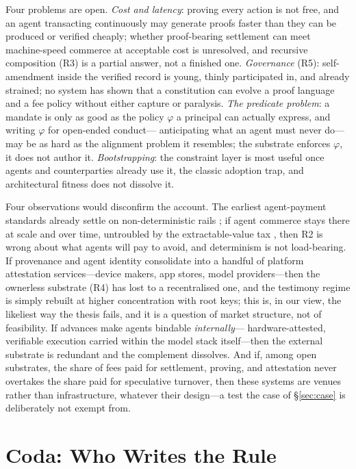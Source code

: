 \documentclass[11pt]{article}
\newcommand{\R}[1]{R#1}
\begin{document}
Four problems are open. \emph{Cost and latency}: proving every action is
not free, and an agent transacting continuously may generate proofs
faster than they can be produced or verified cheaply; whether
proof-bearing settlement can meet machine-speed commerce at acceptable
cost is unresolved, and recursive composition (\R{3}) is a partial answer,
not a finished one. \emph{Governance} (\R{5}): self-amendment inside the
verified record is young, thinly participated in, and already strained;
no system has shown that a constitution can evolve a proof language and
a fee policy without either capture or paralysis. \emph{The predicate
problem}: a mandate is only as good as the policy $\varphi$ a principal
can actually express, and writing $\varphi$ for open-ended conduct---
anticipating what an agent must never do---may be as hard as the
alignment problem it resembles; the substrate enforces $\varphi$, it does
not author it. \emph{Bootstrapping}: the constraint layer is most useful
once agents and counterparties already use it, the classic adoption
trap, and architectural fitness does not dissolve it.

Four observations would disconfirm the account. The earliest
agent-payment standards already settle on non-deterministic rails
\citep{x402coinbase2025}; if agent commerce stays there at scale and over
time, untroubled by the extractable-value tax \citep{daian2020flashboys},
then \R{2} is wrong about what agents will pay to avoid, and determinism
is not load-bearing.
If provenance and agent identity consolidate into a handful of platform
attestation services---device makers, app stores, model
providers---then the ownerless substrate (\R{4}) has lost to a
recentralised one, and the testimony regime is simply rebuilt at higher
concentration with root keys; this is, in our view, the likeliest way the
thesis fails, and it is a question of market structure, not of
feasibility. If advances make agents bindable \emph{internally}---
hardware-attested, verifiable execution carried within the model stack
itself---then the external substrate is redundant and the complement
dissolves. And if, among open substrates, the share of fees paid for
settlement, proving, and attestation never overtakes the share paid for
speculative turnover, then these systems are venues rather than
infrastructure, whatever their design---a test the case of
\S\ref{sec:case} is deliberately not exempt from.

\section{Coda: Who Writes the Rule}
\label{sec:coda}
\end{document}
